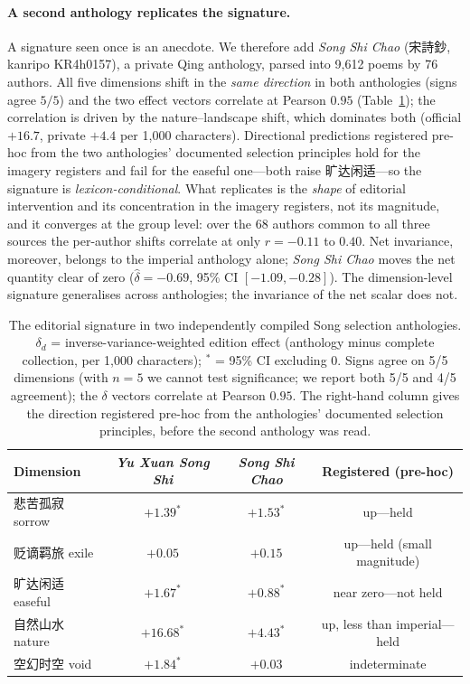 \documentclass[10pt]{article}
\begin{document}
\paragraph{A second anthology replicates the signature.} A signature seen once is an
anecdote. We therefore add \emph{Song Shi Chao} (宋詩鈔, kanripo KR4h0157), a private
Qing anthology, parsed into 9{,}612 poems by 76 authors. All five dimensions shift in
the \emph{same direction} in both anthologies (signs agree $5/5$) and the two effect
vectors correlate at Pearson $0.95$ (Table~\ref{tab:rep}); the correlation is driven
by the nature--landscape shift, which dominates both (official $+16.7$, private
$+4.4$ per 1{,}000 characters). Directional predictions registered pre-hoc from the
two anthologies' documented selection principles hold for the imagery registers and
fail for the easeful one---both raise 旷达闲适---so the signature is
\emph{lexicon-conditional}. What replicates is the \emph{shape} of editorial
intervention and its concentration in the imagery registers, not its magnitude, and
it converges at the group level: over the 68 authors common to all three sources the
per-author shifts correlate at only $r{=}-0.11$ to $0.40$. Net invariance, moreover,
belongs to the imperial anthology alone; \emph{Song Shi Chao} moves the net quantity
clear of zero ($\hat\delta{=}-0.69$, 95\% CI $[-1.09,-0.28]$). The dimension-level
signature generalises across anthologies; the invariance of the net scalar does not.

\begin{table}[H]
\centering\footnotesize
\caption{The editorial signature in two independently compiled Song selection
anthologies. $\delta_d$ = inverse-variance-weighted edition effect (anthology minus
complete collection, per 1{,}000 characters); $^*$ = 95\% CI excluding $0$. Signs
agree on 5/5 dimensions (with $n{=}5$ we cannot test significance; we report both
5/5 and 4/5 agreement); the $\delta$ vectors correlate at Pearson $0.95$. The
right-hand column gives the direction registered pre-hoc from the anthologies'
documented selection principles, before the second anthology was read.}
\label{tab:rep}
\begin{tabular}{lccc}
\toprule
Dimension & \emph{Yu Xuan Song Shi} & \emph{Song Shi Chao} & Registered (pre-hoc)\\
\midrule
悲苦孤寂 sorrow & $+1.39^*$ & $+1.53^*$ & up---held\\
贬谪羁旅 exile & $+0.05$ & $+0.15$ & up---held (small magnitude)\\
旷达闲适 easeful & $+1.67^*$ & $+0.88^*$ & near zero---not held\\
自然山水 nature & $+16.68^*$ & $+4.43^*$ & up, less than imperial---held\\
空幻时空 void & $+1.84^*$ & $+0.03$ & indeterminate\\
\bottomrule
\end{tabular}
\end{table}
\end{document}
